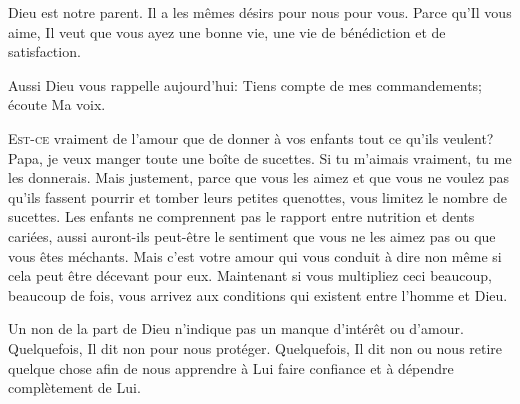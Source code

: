 Dieu est notre parent. Il a les mêmes désirs pour nous \ocadr pour vous.
 Parce qu'Il vous aime, Il veut que vous ayez une bonne vie,
 une vie de bénédiction et de satisfaction. 

Aussi Dieu vous rappelle aujourd'hui: 
 \Og Tiens compte de mes commandements; écoute Ma voix. \Fg{}

\dvrule








\lettrine{E}{st-ce} vraiment de l'amour que de donner à vos enfants
 tout ce qu'ils veulent?
 \Og Papa, je veux manger toute une boîte de sucettes.
 Si tu m'aimais vraiment, tu me les donnerais. \Fg{}
 Mais justement, parce que vous les aimez et que vous ne voulez pas
 qu'ils fassent pourrir et tomber leurs petites quenottes,
 vous limitez le nombre de sucettes.
 Les enfants ne comprennent pas le rapport entre nutrition et dents cariées,
 aussi auront-ils peut-être le sentiment que vous ne les aimez pas
 ou que vous êtes méchants. Mais c'est votre amour qui vous conduit à dire
 \Og non \Fg{} même si cela peut être décevant pour eux.
 Maintenant si vous multipliez ceci beaucoup, beaucoup de fois,
 vous arrivez aux conditions qui existent entre l'homme et Dieu. 


Un \Og non \Fg{} de la part de Dieu n'indique pas un 
 manque d'intérêt ou d'amour.
 Quelquefois, Il dit \Og non \Fg{} pour nous protéger.
 Quelquefois, Il dit \Og non \Fg{} ou nous retire quelque chose
 afin de nous apprendre à Lui faire confiance
 et à dépendre complètement de Lui. 

